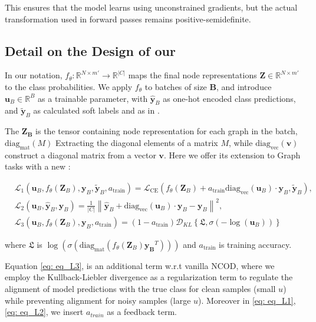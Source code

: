 {This ensures that the model learns using unconstrained gradients, but the actual transformation used in forward passes remains positive-semidefinite.


\subsection{Detail on the Design of our \method }
\label{appendix:details_GCOD_method}
In our notation, $f_{\theta}: \mathbb{R}^{N \times m'} \rightarrow \mathbb{R}^{|C|}$ maps the final node representations \(\mathbf{Z}\in\mathbb{R}^{N \times m'}\) to the class probabilities.
We apply $f_{\theta}$ to batches of size $ \mathbf{B}$, and introduce $\mathbf{u}_B \in \mathbb{R}^B$ as a trainable parameter, with \(\mathbf{\hat{y}}_B \) as one-hot encoded class predictions, and $\mathbf{\tilde{y}}_B$ as calculated soft labels and as in \cite{wani2023combining}.


The \( \mathbf{Z_B}\) is the tensor containing node representation for each graph in the batch, 
$\text{diag}_{\text{mat}}(M)$  Extracting the diagonal elements of a matrix $M$, while 
$\text{diag}_{\text{vec}}(\mathbf{v})$ construct  a diagonal matrix from a vector $\mathbf{v}$. Here we offer its extension to Graph tasks with a new \method:

\begin{align}
\label{eq: eq_L1}
& \mathcal{L}_1(\mathbf{u}_B, f_{\theta}(\mathbf{Z}_B), \mathbf{y}_B, \mathbf{\tilde{y}}_B, a_{\text{train}}) = \mathcal{L}_{\text{CE}}( f_{\theta}(\mathbf{Z}_B) + a_{\text{train}} \text{diag}_\text{vec}(\mathbf{u}_B) \cdot \mathbf{y}_B, \mathbf{\tilde{y}}_B),  \\
\label{eq: eq_L2} 
& \mathcal{L}_2(\mathbf{u}_B, \mathbf{\hat{y}}_B, \mathbf{y}_B)  = \frac{1}{|C|} \left\| \mathbf{\hat{y}}_B + \text{diag}_\text{vec}(\mathbf{u}_B) \cdot \mathbf{y}_B - \mathbf{y}_B \right\|^2, \\
\label{eq: eq_L3}
& \mathcal{L}_3(\mathbf{u}_B, f_{\theta}(\mathbf{Z}_B), \mathbf{y}_B, a_{\text{train}}) = (1 - a_{\text{train}}) \mathcal{D}_{KL} \left\{ \mathfrak{L}, \sigma\left(-\log\left(\mathbf{u}_B\right)\right) \right\}
\end{align}

where  $\mathfrak{L}$ is $\log(\sigma \left( \text{diag}_\text{mat}(f_{\theta}(\mathbf{Z}_B)\mathbf{{y}_B}^T) \right))$ and $a_{\text{train}}$ is training accuracy. 

Equation \ref{eq: eq_L3}, is an additional term w.r.t vanilla NCOD, where we employ the Kullback-Liebler divergence as a regularization term to regulate the alignment of model predictions with the true class for clean samples (small $u$) while preventing alignment for noisy samples (large $u$). Moreover in \eqref{eq: eq_L1}, \ref{eq: eq_L2}, we insert $a_{train}$ as a feedback term.\\

}
